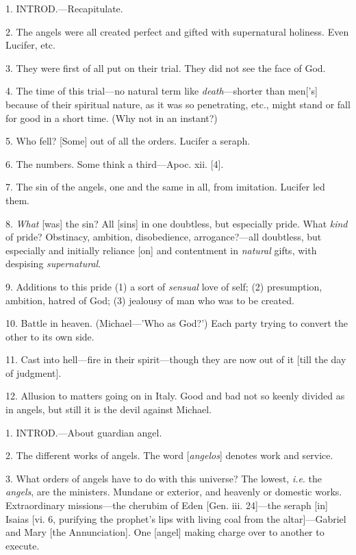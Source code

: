 
1. INTROD.—Recapitulate.

2. The angels were all created perfect and gifted
with supernatural holiness. Even Lucifer, etc.

3. They were first of all put on their trial.
They did not see the face of God.

4. The time of this trial—no natural term like \emph{death}—shorter
than men['s] because of their spiritual nature, as it was so
penetrating, etc., might stand or fall for good in a short time. (Why
not in an instant?)

5. Who fell? [Some] out of all the orders.
Lucifer a seraph.

6. The numbers. Some think a third—Apoc. xii.
[4].

7. The sin of the angels, one and the same in
all, from imitation. Lucifer led them.

8. \emph{What} [was] the sin? All [sins] in one
doubtless, but especially pride. What \emph{kind} of pride? Obstinacy,
ambition, disobedience, arrogance?—all doubtless, but especially and
initially reliance [on] and contentment in \emph{natural} gifts, with
despising \emph{supernatural}.

9. Additions to this pride (1) a sort of \emph{sensual}
love of self; (2) presumption, ambition, hatred of God; (3) jealousy
of man who was to be created.

10. Battle in heaven. (Michael—'Who as God?')
Each party trying to convert the other to its own side.

11. Cast into hell—fire in their
spirit—though they are now out of it [till the day of judgment].

12. Allusion to matters going on in Italy. Good
and bad not so keenly divided as in angels, but still it is the devil
against Michael.


1. INTROD.—About
guardian angel.

2. The different works of angels. The word [\emph{angelos}]
denotes work and service.

3. What orders of angels have to do with this
universe? The lowest, \emph{i.e}. the \emph{angels}, are the
ministers. Mundane or exterior, and heavenly or domestic works.
Extraordinary missions—the cherubim of Eden [Gen. iii. 24]—the
seraph [in] Isaias [vi. 6, purifying the prophet's lips with living
coal from the altar]—Gabriel and Mary [the Annunciation]. One
[angel] making charge over to another to execute.

